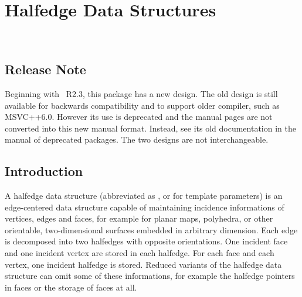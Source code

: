 
\ccParDims

\chapter{Halfedge Data Structures}
\label{chapterHalfedgeDS}
\\

\minitoc

\section{Release Note}

Beginning with \cgal\ R2.3, this package has a new design.  The old
design is still available for backwards compatibility and to support
older compiler, such as MSVC++6.0. However its use is deprecated and
the manual pages are not converted into this new manual
format. Instead, see its old documentation in the manual of 
deprecated packages. The two designs are not interchangeable.

\section{Introduction}

A halfedge data structure (abbreviated as , or
 for template parameters) is an edge-centered data structure
capable of maintaining incidence informations of vertices, edges and
faces, for example for planar maps, polyhedra, or other orientable,
two-dimensional surfaces embedded in arbitrary dimension. Each edge is
decomposed into two halfedges with opposite orientations. One incident
face and one incident vertex are stored in each halfedge.  For each
face and each vertex, one incident halfedge is stored.  Reduced
variants of the halfedge data structure can omit some of these
informations, for example the halfedge pointers in faces or the
storage of faces at all.

